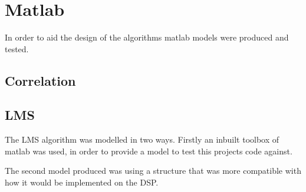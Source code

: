\section{Matlab}
In order to aid the design of the algorithms matlab models were produced and
tested.

\subsection{Correlation}

\subsection{LMS}
The LMS algorithm was modelled in two ways.
Firstly an inbuilt toolbox of matlab was used, in order to provide a model to test this projects code against.

%
The second model produced was using a structure that was more compatible with how it would be implemented on the DSP.

